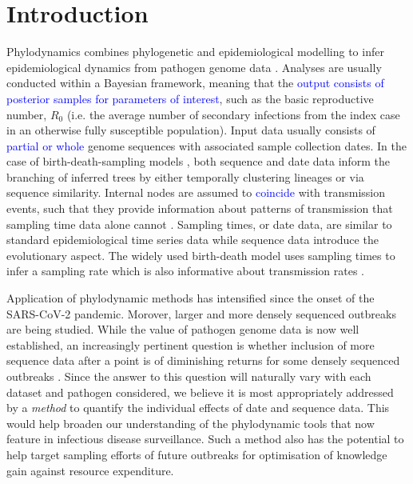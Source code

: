 \documentclass{article}
\begin{document}
\section*{Introduction}
Phylodynamics combines phylogenetic and epidemiological modelling to infer epidemiological dynamics from pathogen genome data \citep{du2015getting,baele2018recent,volz2013viral}. Analyses are usually conducted within a Bayesian framework, meaning that the \textcolor{blue}{output consists of posterior samples for parameters of interest}, such as the basic reproductive number, $R_{0}$ (i.e. the average number of secondary infections from the index case in an otherwise fully susceptible population). Input data usually consists of \textcolor{blue}{partial or whole} genome sequences with associated sample collection dates. In the case of birth-death-sampling models \citep{stadler_sampling-through-time_2010}, both sequence and date data inform the branching of inferred trees by either temporally clustering lineages or via sequence similarity.  Internal nodes are assumed to \textcolor{blue}{coincide} with transmission events, such that they provide information about patterns of transmission that sampling time data alone cannot \citep{featherstone_epidemiological_2022}. Sampling times, or date data, are similar to standard epidemiological time series data while sequence data introduce the evolutionary aspect. The widely used birth-death model uses sampling times to infer a sampling rate which is also informative about transmission rates \citep{boskova2018influence,stadler2012estimating}. 

Application of phylodynamic methods has intensified since the onset of the SARS-CoV-2 pandemic. Morover, larger and more densely sequenced outbreaks are being studied. While the value of pathogen genome data is now well established, an increasingly pertinent question is whether inclusion of more sequence data after a point is of diminishing returns for some densely sequenced outbreaks \citep{porter2022new, hill2021progress}. Since the answer to this question will  naturally vary with each dataset and pathogen considered, we believe it is most appropriately addressed by a \emph{method} to quantify the individual effects of date and sequence data. This would help broaden our understanding of the phylodynamic tools that now feature in infectious disease surveillance. Such a method also has the potential to help target sampling efforts of future outbreaks for optimisation of knowledge gain against resource expenditure. 
\end{document}
